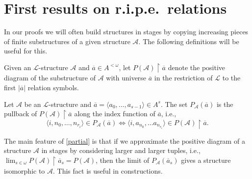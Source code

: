 \documentclass[11pt]{amsart}
\newcommand{\A}{{\mathcal{A}}}
\renewcommand{\bar}[1]{\overline{#1}}
\newcommand{\restupa}[1]{P(\A)\restriction #1}
\begin{document}

\section{First results on r.i.p.e.\ relations}\label{sec:ripe}

In our proofs we will often build structures in stages by copying increasing pieces of finite substructures of a given structure $\A$. The following definitions will be useful for this.
\begin{defn}
   Given an $\mathcal L$-structure $\A$ and $\overline a\in A^{<\omega}$, let $\restupa{\overline a}$ denote the positive diagram of the substructure of $\A$ with universe $\overline a$ in the restriction of $\mathcal L$ to the first $|\overline a|$ relation symbols.
\end{defn}

\begin{defn}\label{partial}
    Let $\A$ be an $\mathcal L$-structure and $\overline{a}= \langle a_0, \dots , a_{s-1} \rangle\in A^s$. The set $P_{\A}(\overline a)$ is the pullback of $\restupa{\overline a}$ along the index function of $\overline a$, i.e., 
    \[ \langle i,n_0,\dots, n_{r_i}\rangle\in P_{\A}(\overline a) \Leftrightarrow \langle i, a_{n_0},\dots a_{n_{r_i}}\rangle \in \restupa{\overline a}.\]
\end{defn}
The main feature of \cref{partial} is that if we approximate the positive diagram of a structure $\A$ in stages by considering larger and larger tuples, i.e., $\lim_{s\in\omega} \restupa{\overline a_s}=P(\A)$, then the limit of $P_{\A}(\overline a_s)$ gives a structure isomorphic to $\A$. This fact is useful in constructions.  
\end{document}
